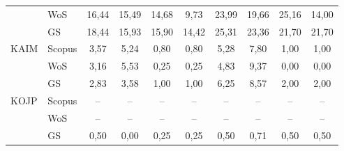 \begin{table}
\begin{tabular}{llcccccccc}
      & WoS    & 16,44       & 15,49 & 14,68 & 9,73  & 23,99   & 19,66 & 25,16 & 14,00 \\
      & GS     & 18,44       & 15,93 & 15,90 & 14,42 & 25,31   & 23,36 & 21,70 & 21,70 \\[1ex]
 KAIM & Scopus & 3,57        & 5,24  & 0,80  & 0,80  & 5,28    & 7,80  & 1,00  & 1,00  \\
      & WoS    & 3,16        & 5,53  & 0,25  & 0,25  & 4,83    & 9,37  & 0,00  & 0,00  \\
      & GS     & 2,83        & 3,58  & 1,00  & 1,00  & 6,25    & 8,57  & 2,00  & 2,00  \\[1ex]
 KOJP & Scopus & --          & --    & --    & --    & --      & --    & --    & --    \\
      & WoS    & --          & --    & --    & --    & --      & --    & --    & --    \\
      & GS     & 0,50        & 0,00  & 0,25  & 0,25  & 0,50    & 0,71  & 0,50  & 0,50  \\[0.5ex]
  \bottomrule
\end{tabular}
\end{table}

